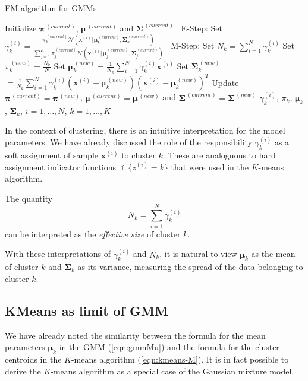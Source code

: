 \documentclass[final,3p,times,twocolumn]{elsarticle}
\let\bs\boldsymbol
\DeclareMathOperator*{\id}{\mathds{1}}
\begin{document}
\begin{algorithm}
\caption{EM algorithm for GMMs}
\label{alg:gmm}
\begin{algorithmic}[1]
\State Initialize $\bs\pi^{\,(current)}$, $\bs\mu^{\,(current)}$ and $\bs\Sigma^{\,(current)}$
\Statex\Repeat
\Statex \quad\, E-Step:
\State Set $\gamma_k^{(i)} = \frac{\pi_k^{\,(current)}\mathcal{N}(\bs x^{(i)}|\,\bs\mu_k^{\,(current)}, \bs\Sigma_k^{\,(current)})}{\sum_{j=1}^K \pi_j^{\,(current)}\mathcal{N}(\bs x^{(i)}|\,\bs\mu_j^{\,(current)}, \bs\Sigma_j^{\,(current)})}$
\EndFor
\EndFor
\Statex\Statex \quad\, M-Step:
\State Set $N_k = \sum_{i=1}^N \gamma_k^{(i)}$
\State Set $\pi_k^{\,(new)} = \frac{N_k}{N}$
\State Set $\bs\mu_k^{\,(new)} = \frac{1}{N_k}\sum_{i=1}^N \gamma_k^{(i)} \bs x^{(i)}$
\State Set $\bs\Sigma_k^{\,(new)} $
\Statex \qquad \qquad $=\frac{1}{N_k}\sum_{i=1}^N \gamma_k^{(i)}(\bs x^{(i)} - \bs\mu_k^{\,(new)})(\bs x^{(i)} - \bs\mu_k^{\,(new)})^T$
\Statex\State Update $\bs\pi^{\,(current)} = \bs\pi^{\,(new)}$, $\bs\mu^{\,(current)} = \bs\mu^{\,(new)}$
\Statex \qquad\qquad and $\bs\Sigma^{\,(current)} = \bs\Sigma^{\,(new)}$
\EndFor
{}
\Statex\State\Return $\gamma^{(i)}_k$, $\pi_k$, $\bs\mu_k$, $\bs\Sigma_k$, \quad $i=1,\dots,N$, $k=1,\dots,K$
\end{algorithmic}
\end{algorithm}

In the context of clustering, there is an intuitive interpretation for the model parameters.
We have already discussed the role of the responsibility $\gamma_k^{(i)}$ as a soft assignment of sample $\bs x^{(i)}$ to cluster $k$.
These are analoguous to hard assignment indicator functions $\id\{z^{(i)}=k\}$ that were used in the $K$-means algorithm.

The quantity
\begin{equation*}
\label{eqn:gmmclustersize}
N_k = \sum_{i=1}^N \gamma_k^{(i)}
\end{equation*}
can be interpreted as the \emph{effective size} of cluster $k$.

With these interpretations of $\gamma_k^{(i)}$ and $N_k$, it is natural to view $\bs\mu_k$ as the mean of cluster $k$ and $\bs\Sigma_k$ as its variance, measuring the spread of the data belonging to cluster $k$.



\subsection{KMeans as limit of GMM}
We have already noted the similarity between the formula for the mean parameters $\bs\mu_k$ in the GMM (\ref{eqn:gmmMu}) and the formula for the cluster centroids in the $K$-means algorithm (\ref{eqn:kmeans-M}).
It is in fact possible to derive the $K$-means algorithm as a special case of the Gaussian mixture model.
\end{document}
